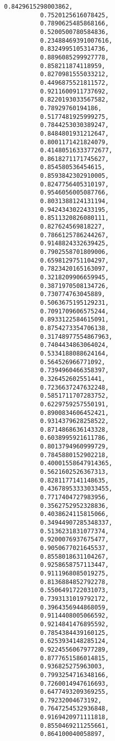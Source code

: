 \documentclass[11pt]{article}
\begin{document}
\begin{Verbatim}[commandchars=\\\{\}]
          0.8429615298003862,
          0.7520125616078425,
          0.7890625485868166,
          0.5200500780584836,
          0.23488469391007616,
          0.8324995105314736,
          0.8896085299927778,
          0.858211874118959,
          0.8270981555033212,
          0.4496875521811572,
          0.9211600911737692,
          0.8220193033567582,
          0.78929760194186,
          0.5177481925999275,
          0.7844253030389247,
          0.8484801931212647,
          0.8001171421824079,
          0.41480516333772677,
          0.8618271171745627,
          0.854580536454615,
          0.8593842302910005,
          0.8247756405310197,
          0.9546056005087766,
          0.8031388124131194,
          0.9424343022433195,
          0.8511320826080111,
          0.827624569818227,
          0.7866125786244267,
          0.9148824332639425,
          0.7902558701809006,
          0.6598129751104297,
          0.7823420165163097,
          0.3218209906659945,
          0.3871970508134726,
          0.730774763045889,
          0.5063675195129231,
          0.7091709606575244,
          0.8933122584615091,
          0.8754273354706138,
          0.31748977554867963,
          0.7404434863064024,
          0.5334188088624164,
          0.564526966771092,
          0.7394960466358397,
          0.326452602551441,
          0.7236637247632248,
          0.5851711707283752,
          0.6229759257550191,
          0.8900834606452421,
          0.9314379628258522,
          0.8714868636143328,
          0.6038995921611786,
          0.8013794960999729,
          0.7845880152902218,
          0.40001558647914365,
          0.5621602526367313,
          0.8281177141148635,
          0.43678953333033455,
          0.7717404727983956,
          0.3562752952328836,
          0.4038624115815066,
          0.34944907285348337,
          0.5136231831077374,
          0.9200076937675477,
          0.9050677021645537,
          0.8558018631104267,
          0.9258658757113447,
          0.9111968085019275,
          0.8136884852792278,
          0.5506491722031073,
          0.7393131019792172,
          0.3964356944868059,
          0.9114408005066592,
          0.9214841476895592,
          0.7854384439160125,
          0.6253934148285124,
          0.9224556067977289,
          0.8777651586014815,
          0.936825275963003,
          0.7993254716348166,
          0.7260014947616693,
          0.6477493209369255,
          0.79232004673192,
          0.7647254532936848,
          0.9169420971111818,
          0.8550469211255661,
          0.864100040058897,

\end{Verbatim}
\end{document}
